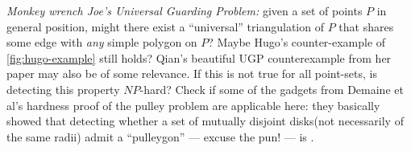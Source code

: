 \begin{appendices}
\begin{description}
\begin{itemize}
             \textit{Monkey wrench \ala Joe's Universal Guarding Problem:}
             given a set of points $P$ in general position, might there exist a ``universal'' triangulation of $P$ that shares some edge with  
             \textit{any} simple polygon on $P$? Maybe Hugo's counter-example of \autoref{fig:hugo-example} still holds? Qian's beautiful UGP 
                           counterexample from her paper may also be of some relevance. 
                           If this is not true for all point-sets, is detecting this property $NP$-hard? Check if some of the gadgets from 
                           Demaine et al's hardness proof of the pulley problem are applicable here: they basically showed that detecting
                           whether a set of mutually disjoint disks(not necessarily of the same radii) admit a ``pulleygon'' --- excuse the pun! --- is \nph. 
      \end{itemize}
 


          
          


          

\end{description}
\end{appendices}
